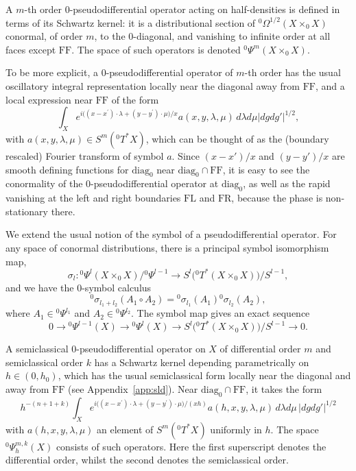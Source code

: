 \documentclass[10pt, a4paper, twoside]{amsart}
\numberwithin{equation}{section}
\theoremstyle{remark}
\begin{document}
A $m$-th order $0$-pseudodifferential operator acting on half-densities is defined in terms of its Schwartz kernel: it is a distributional section of ${}^0 \Omega^{1/2}(X \times_0 X)$ conormal, of order $m$, to the $0$-diagonal, and vanishing to infinite order at all faces except ${\mathrm{FF}}$. The space of such operators is denoted ${}^0 \Psi^m(X \times_0 X)$. 

To be more explicit, a $0$-pseudodifferential operator of $m$-th order has the usual oscillatory integral representation locally near the diagonal away from ${\mathrm{FF}}$, and  a local expression near ${\mathrm{FF}}$ of the form 
$$
\int_{X} e^{i \big( (x - x^\prime) \cdot \lambda + (y - y^\prime) \cdot \mu \big) / x} a(x, y, \lambda, \mu) \, d\lambda d\mu |dg dg'|^{1/2}, 
$$ 
with $a (x, y, \lambda, \mu) \in S^m({}^0T^* X)$, which can be thought of as the (boundary rescaled) Fourier transform of symbol $a$. Since $(x-x')/x$ and $(y-y')/x$ are smooth defining functions for ${\mathrm{diag}_0}$ near ${\mathrm{diag}_0} \cap {\mathrm{FF}}$,  it is easy to see the conormality of the $0$-pseudodifferential operator at ${\mathrm{diag}_0}$, as well as the rapid vanishing at the left and right boundaries ${\mathrm{FL}}$ and ${\mathrm{FR}}$, because the phase is non-stationary there. 

We extend the usual notion of the symbol of a pseudodifferential operator. For any space of conormal distributions, there is a principal symbol isomorphism  map, $$\sigma_l : {}^0 \Psi^l(X \times_0 X) / {}^0 \Psi^{l - 1} \longrightarrow S^l\big({}^0T^\ast (X \times_0 X)\big) / S^{l - 1},$$ and we have the $0$-symbol calculus $${}^0\sigma_{l_1 + l_2}(A_1 \circ A_2) = {}^0\sigma_{l_1}(A_1){}^0\sigma_{l_2}(A_2),$$ where $A_1 \in {}^0 \Psi^{l_1}$ and $A_2 \in {}^0 \Psi^{l_2}$. The symbol map gives an exact sequence $$0 \longrightarrow {}^0\Psi^{l - 1}(X) \longrightarrow {}^0\Psi^l(X) \longrightarrow S^l\big({}^0T^\ast (X \times_0 X)\big) / S^{l - 1} \longrightarrow 0 .$$

A semiclassical $0$-pseudodifferential operator on $X$ of differential order $m$ and semiclassical order $k$ has a Schwartz kernel depending parametrically on $h \in (0, h_0)$, which has the usual semiclassical form locally near the diagonal and away from ${\mathrm{FF}}$ (see Appendix~\ref{app:sld}). Near ${\mathrm{diag}_0} \cap {\mathrm{FF}}$, it  takes the form  
$$
h^{ - (n + 1+k)} \int_{X} e^{i \big( (x - x^\prime) \cdot \lambda + (y - y^\prime) \cdot \mu \big) / (x h)} a(h, x, y, \lambda, \mu) \, d\lambda d\mu \, |dg dg'|^{1/2} 
$$ 
with $a (h, x, y, \lambda, \mu)$ an element of $S^m({}^0T^* X)$ uniformly in $h$. The space ${}^0 \Psi^{m, k}_h(X)$ consists of such operators.  Here the first superscript denotes the differential order, whilst the second denotes the semiclassical order.
\end{document}

